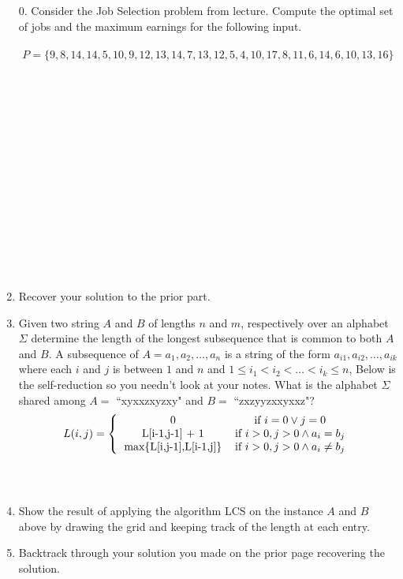 \documentclass[12pt]{article}
\begin{document}
\begin{enumerate}
    \item[0.] Consider the Job Selection problem from lecture. Compute the optimal set of jobs and the maximum earnings for the following input.\\\\
$$P=\{9, 8, 14, 14, 5, 10, 9, 12, 13, 14, 7, 13, 12, 5, 4, 10, 17, 8, 11, 6, 14, 6, 10, 13, 16\}$$
\\\\\\\\\\\\\\\\\\\\\\\\\\\\
\item Recover your solution to the prior part.
\newpage
\item Given two string $A$ and $B$ of lengths $n$ and $m$, respectively over an alphabet $\Sigma$ determine the length of the longest subsequence that 
is common to both $A$ and $B$. A subsequence of $A = a_1,a_2,\dots,a_n$ is a string of the form $a_{i1},a_{i2},\dots,a_{ik}$ where each $i$ and $j$ is between $1$ and $n$ 
and $1 \leq i_1 < i_2< \dots<i_k \leq n$, Below is the self-reduction so you needn't look at your notes. What is the alphabet $\Sigma$ shared among $A =$ ``xyxxzxyzxy" and $B =$ ``zxzyyzxxyxxz"?
\[
L(i,j) = \left\{
\begin{tabular}{cc}
0 & \text{if} $i = 0 \lor j = 0$ \\
L[i-1,j-1] + 1 & \text{if} $i > 0, j > 0 \land a_i = b_j$  \\
max\{L[i,j-1],L[i-1,j]\} & \text{if} $i > 0, j > 0 \land a_i \ne b_j$   \\
\end{tabular}\right.
\]
\\\\
\item Show the result of applying the algorithm LCS on the instance $A$ and $B$ above by drawing the grid and keeping track of the 
length at each entry.
\newpage
 \item Backtrack through your solution you made on the prior page recovering the solution.\\\\\\\\\\\\\\\\

\end{enumerate}
\end{document}

